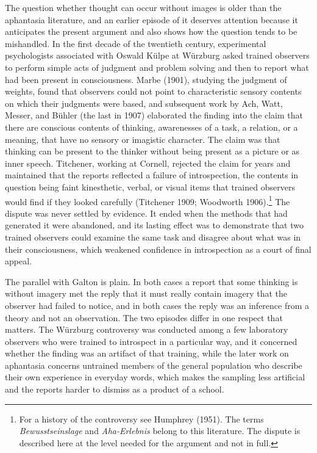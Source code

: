 \documentclass[11pt]{article}
\theoremstyle{remark}
\begin{document}
The question whether thought can occur without images is older than the aphantasia literature, and an earlier episode of it deserves attention because it anticipates the present argument and also shows how the question tends to be mishandled. In the first decade of the twentieth century, experimental psychologists associated with Oswald K\"ulpe at W\"urzburg asked trained observers to perform simple acts of judgment and problem solving and then to report what had been present in consciousness. Marbe (1901), studying the judgment of weights, found that observers could not point to characteristic sensory contents on which their judgments were based, and subsequent work by Ach, Watt, Messer, and B\"uhler (the last in 1907) elaborated the finding into the claim that there are conscious contents of thinking, awarenesses of a task, a relation, or a meaning, that have no sensory or imagistic character. The claim was that thinking can be present to the thinker without being present as a picture or as inner speech. Titchener, working at Cornell, rejected the claim for years and maintained that the reports reflected a failure of introspection, the contents in question being faint kinesthetic, verbal, or visual items that trained observers would find if they looked carefully (Titchener 1909; Woodworth 1906).\footnote{For a history of the controversy see Humphrey (1951). The terms \emph{Bewusstseinslage} and \emph{Aha-Erlebnis} belong to this literature. The dispute is described here at the level needed for the argument and not in full.} The dispute was never settled by evidence. It ended when the methods that had generated it were abandoned, and its lasting effect was to demonstrate that two trained observers could examine the same task and disagree about what was in their consciousness, which weakened confidence in introspection as a court of final appeal.

The parallel with Galton is plain. In both cases a report that some thinking is without imagery met the reply that it must really contain imagery that the observer had failed to notice, and in both cases the reply was an inference from a theory and not an observation. The two episodes differ in one respect that matters. The W\"urzburg controversy was conducted among a few laboratory observers who were trained to introspect in a particular way, and it concerned whether the finding was an artifact of that training, while the later work on aphantasia concerns untrained members of the general population who describe their own experience in everyday words, which makes the sampling less artificial and the reports harder to dismiss as a product of a school.
\end{document}

